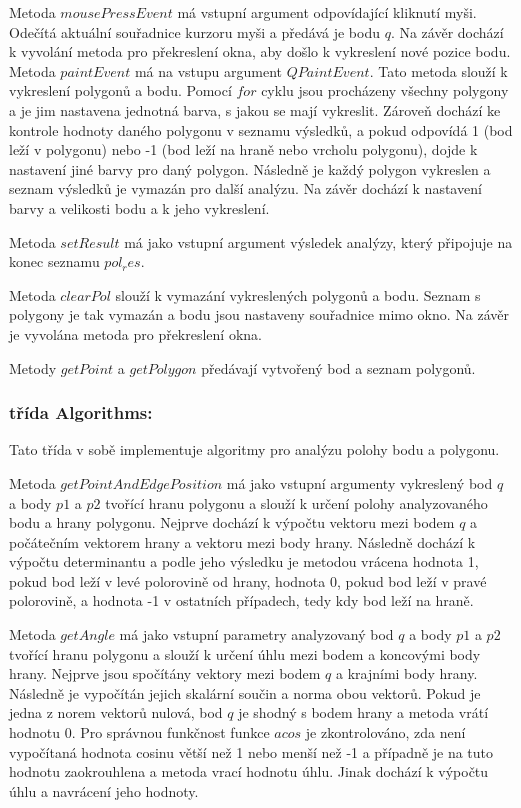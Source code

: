 \documentclass[15pt]{article}
\begin{document}
\begin{spacing}{1.5}
\noindent Metoda $mousePressEvent$ má vstupní argument odpovídající kliknutí myši. Odečítá aktuální souřadnice kurzoru myši a předává je bodu $q$. Na závěr dochází k vyvolání metoda pro překreslení okna, aby došlo k vykreslení nové pozice bodu.
\noindent Metoda $paintEvent$ má na vstupu argument $QPaintEvent$. Tato metoda slouží k vykreslení polygonů a bodu. Pomocí $for$ cyklu jsou procházeny všechny polygony a je jim nastavena jednotná barva, s jakou se mají vykreslit. Zároveň dochází ke kontrole hodnoty daného polygonu v seznamu výsledků, a pokud odpovídá 1 (bod leží v polygonu) nebo -1 (bod leží na hraně nebo vrcholu polygonu), dojde k nastavení jiné barvy pro daný polygon. Následně je každý polygon vykreslen a seznam výsledků je vymazán pro další analýzu. Na závěr dochází k nastavení barvy a velikosti bodu a k jeho vykreslení.

\noindent Metoda $setResult$ má jako vstupní argument výsledek analýzy, který připojuje na konec seznamu $pol_res$.

\noindent Metoda $clearPol$ slouží k vymazání vykreslených polygonů a bodu. Seznam s polygony je tak vymazán a bodu jsou nastaveny souřadnice mimo okno. Na závěr je vyvolána metoda pro překreslení okna.

\noindent Metody $getPoint$ a $getPolygon$ předávají vytvořený bod a seznam polygonů.

\subsubsection*{třída Algorithms:}
Tato třída v sobě implementuje algoritmy pro analýzu polohy bodu a polygonu.

\noindent Metoda $getPointAndEdgePosition$ má jako vstupní argumenty vykreslený bod $q$ a body $p1$ a $p2$ tvořící hranu polygonu a slouží k určení polohy analyzovaného bodu a hrany polygonu. Nejprve dochází k výpočtu vektoru mezi bodem $q$ a počátečním vektorem hrany a vektoru mezi body hrany. Následně dochází k výpočtu determinantu a podle jeho výsledku je metodou vrácena hodnota 1, pokud bod leží v levé polorovině od hrany, hodnota 0, pokud bod leží v pravé polorovině, a hodnota -1 v ostatních případech, tedy kdy bod leží na hraně.

\noindent Metoda $getAngle$ má jako vstupní parametry analyzovaný bod $q$ a body $p1$ a $p2$ tvořící hranu polygonu a slouží k určení úhlu mezi bodem a koncovými body hrany. Nejprve jsou spočítány vektory mezi bodem $q$ a krajními body hrany. Následně je vypočítán jejich skalární součin a norma obou vektorů. Pokud je jedna z norem vektorů nulová, bod $q$ je shodný s bodem hrany a metoda vrátí hodnotu 0. Pro správnou funkčnost funkce $acos$ je zkontrolováno, zda není vypočítaná hodnota cosinu větší než 1 nebo menší než -1 a případně je na tuto hodnotu zaokrouhlena a metoda vrací hodnotu úhlu. Jinak dochází k výpočtu úhlu a navrácení jeho hodnoty.


\end{spacing}
\end{document}
